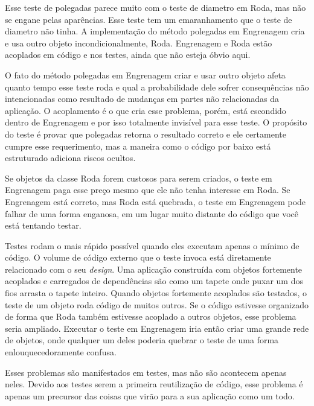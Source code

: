 Esse teste de polegadas parece muito com o teste de diametro em Roda, mas não
se engane pelas aparências. Esse teste tem um emaranhamento que o teste de
diametro não tinha. A implementação do método polegadas em Engrenagem cria e
usa outro objeto incondicionalmente, Roda. Engrenagem e Roda estão acoplados em
código e nos testes, ainda que não esteja óbvio aqui.

O fato do método polegadas em Engrenagem criar e usar outro objeto afeta quanto
tempo esse teste roda e qual a probabilidade dele sofrer consequências
não intencionadas como resultado de mudanças em partes não relacionadas da
aplicação. O acoplamento é o que cria esse problema, porém, está escondido
dentro de Engrenagem e por isso totalmente invisível para esse teste. O propósito
do teste é provar que polegadas retorna o resultado correto e ele certamente cumpre
esse requerimento, mas a maneira como o código por baixo está estruturado adiciona
riscos ocultos.

Se objetos da classe Roda forem custosos para serem criados, o teste em
Engrenagem paga esse preço mesmo que ele não tenha interesse em Roda. Se
Engrenagem está correto, mas Roda está quebrada, o teste em Engrenagem pode
falhar de uma forma enganosa, em um lugar muito distante do código que você
está tentando testar.

Testes rodam o mais rápido possível quando eles executam apenas o mínimo de
código. O volume de código externo que o teste invoca está diretamente
relacionado com o seu \textit{design}. Uma aplicação construída com objetos
fortemente acoplados e carregados de dependências são como um tapete onde puxar
um dos fios arrasta o tapete inteiro. Quando objetos fortemente acoplados são
testados, o teste de um objeto roda código de muitos outros. Se o código estivesse
organizado de forma que Roda também estivesse acoplado a outros objetos, esse
problema seria ampliado. Executar o teste em Engrenagem iria então criar uma
grande rede de objetos, onde qualquer um deles poderia quebrar o teste de uma
forma enlouquecedoramente confusa.

Esses problemas são manifestados em testes, mas não são acontecem apenas neles.
Devido aos testes serem a primeira reutilização de código, esse problema é apenas um
precursor das coisas que virão para a sua aplicação como um todo.
